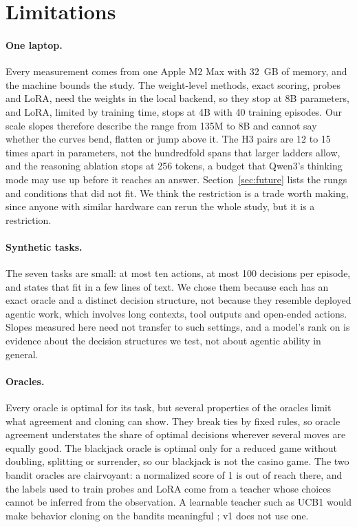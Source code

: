 \section{Limitations}
\label{sec:limitations}

\paragraph{One laptop.}
Every measurement comes from one Apple M2 Max with 32~GB of memory, and the machine bounds the study. The weight-level methods, exact scoring, probes and LoRA, need the weights in the local backend, so they stop at 8B parameters, and LoRA, limited by training time, stops at 4B with 40 training episodes. Our scale slopes therefore describe the range from 135M to 8B and cannot say whether the curves bend, flatten or jump above it. The H3 pairs are 12 to 15 times apart in parameters, not the hundredfold spans that larger ladders allow, and the reasoning ablation stops at 256 tokens, a budget that Qwen3's thinking mode may use up before it reaches an answer. Section~\ref{sec:future} lists the rungs and conditions that did not fit. We think the restriction is a trade worth making, since anyone with similar hardware can rerun the whole study, but it is a restriction.

\paragraph{Synthetic tasks.}
The seven tasks are small: at most ten actions, at most 100 decisions per episode, and states that fit in a few lines of text. We chose them because each has an exact oracle and a distinct decision structure, not because they resemble deployed agentic work, which involves long contexts, tool outputs and open-ended actions. Slopes measured here need not transfer to such settings, and a model's rank on \deadeye{} is evidence about the decision structures we test, not about agentic ability in general.

\paragraph{Oracles.}
Every oracle is optimal for its task, but several properties of the oracles limit what agreement and cloning can show. They break ties by fixed rules, so oracle agreement understates the share of optimal decisions wherever several moves are equally good. The blackjack oracle is optimal only for a reduced game without doubling, splitting or surrender, so our blackjack is not the casino game. The two bandit oracles are clairvoyant: a normalized score of 1 is out of reach there, and the labels used to train probes and LoRA come from a teacher whose choices cannot be inferred from the observation. A learnable teacher such as UCB1 would make behavior cloning on the bandits meaningful \citep{laskin2023incontext,nie2025evolve}; v1 does not use one.

